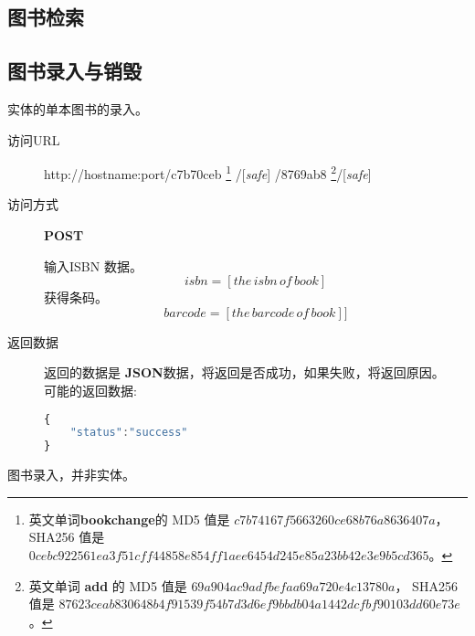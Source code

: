 \documentclass[UTF8]{article}
\def\safe{/[\textit{safe}]}
\def\POST{\colorbox[rgb]{0.77,0.53,0.97}{\textbf{POST}}}
\def\bfJSON{\textbf{JSON}}
\def\viaurl{\item[{\quad\colorbox[rgb]{0.47,0.88,0.89}{访问URL}}]}
\def\viareq#1{\item[{\quad\colorbox[rgb]{0.57,0.88,0.99}{访问方式}}] #1}
\def\rtdata{\item[{\quad\colorbox[rgb]{0.70,0.9,0.59}{返回数据}}]}
\begin{document}
        \subsection{图书检索}
        \subsection{图书录入与销毁}
        实体的单本图书的录入。
        \begin{description}
            \viaurl  http://hostname:port/c7b70ceb
            \footnote{
                英文单词\textbf{bookchange}的
                MD5 值是 $c7b74167f5663260ce68b76a8636407a $，
                SHA256 值是 $0cebc922561ea3f51cff44858e854ff1aee6454d245e85a23bb42e3e9b5cd365$。
            }
            \safe
            /8769ab8
            \footnote{
                英文单词 \textbf{add} 的
                MD5 值是 $69a904ac9adfbefaa69a720e4c13780a $，
                SHA256 值是 $87623ceab830648b4f91539f54b7d3d6ef9bbdb04a1442dcfbf90103dd60e73e$。
            }\safe

            \viareq{\POST}

             输入ISBN 数据。
            $$isbn=[the\,isbn\,of\,book]$$
             获得条码。
            $$barcode=[the\,barcode\,of\,book]]$$
            \rtdata 返回的数据是 \bfJSON 数据，将返回是否成功，如果失败，将返回原因。
            \\ 可能的返回数据:
            \begin{lstlisting}[language=JavaScript]
{
    "status":"success"
}
            \end{lstlisting}
        \end{description}
        图书录入，并非实体。
\end{document}
